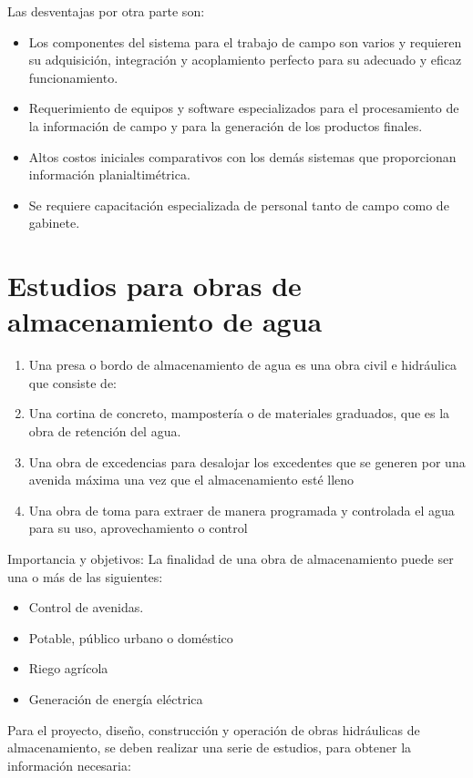 Las desventajas por otra parte son:

\begin{itemize}
    \item Los componentes del sistema para el trabajo de campo son varios y requieren su adquisición, integración y acoplamiento perfecto para su adecuado y eficaz funcionamiento.
    \item Requerimiento de equipos y software especializados para el procesamiento de la información de campo y para la generación de los productos finales.
    \item Altos costos iniciales comparativos con los demás sistemas que proporcionan información planialtimétrica.
    \item Se requiere capacitación especializada de personal tanto de campo como de gabinete.
\end{itemize}    

\section{Estudios para obras de almacenamiento de agua}
\begin{enumerate}
    \item Una presa o bordo de almacenamiento de agua es una obra civil e hidráulica que consiste de:
    \item Una cortina de concreto, mampostería o de materiales graduados, que es la obra de retención del agua.
    \item Una obra de excedencias para desalojar los excedentes que se generen por una avenida máxima una vez que el almacenamiento esté lleno
    \item Una obra de toma para extraer de manera programada y controlada el agua para su uso, aprovechamiento o control
\end{enumerate}
Importancia y objetivos: La finalidad de una obra de almacenamiento puede ser una o más de las siguientes:
\begin{itemize}
    \item Control de avenidas.
    \item Potable, público urbano o doméstico
    \item Riego agrícola
    \item Generación de energía eléctrica
\end{itemize}
Para el proyecto, diseño, construcción y operación de obras hidráulicas de almacenamiento, se deben realizar una serie de estudios, para obtener la información necesaria:

